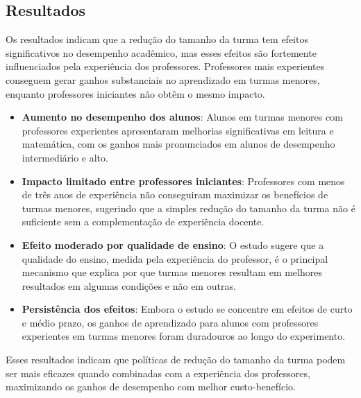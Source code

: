 \documentclass[a4paper,12pt]{article}[abntex2]
\begin{document}
\subsection{\textbf{Resultados}}

Os resultados indicam que a redução do tamanho da turma tem efeitos significativos no desempenho acadêmico, mas esses efeitos são fortemente influenciados pela experiência dos professores. Professores mais experientes conseguem gerar ganhos substanciais no aprendizado em turmas menores, enquanto professores iniciantes não obtêm o mesmo impacto.

\begin{itemize}
    \item \textbf{Aumento no desempenho dos alunos}: Alunos em turmas menores com professores experientes apresentaram melhorias significativas em leitura e matemática, com os ganhos mais pronunciados em alunos de desempenho intermediário e alto.
    \item \textbf{Impacto limitado entre professores iniciantes}: Professores com menos de três anos de experiência não conseguiram maximizar os benefícios de turmas menores, sugerindo que a simples redução do tamanho da turma não é suficiente sem a complementação de experiência docente.
    \item \textbf{Efeito moderado por qualidade de ensino}: O estudo sugere que a qualidade do ensino, medida pela experiência do professor, é o principal mecanismo que explica por que turmas menores resultam em melhores resultados em algumas condições e não em outras.
    \item \textbf{Persistência dos efeitos}: Embora o estudo se concentre em efeitos de curto e médio prazo, os ganhos de aprendizado para alunos com professores experientes em turmas menores foram duradouros ao longo do experimento.
\end{itemize}

Esses resultados indicam que políticas de redução do tamanho da turma podem ser mais eficazes quando combinadas com a experiência dos professores, maximizando os ganhos de desempenho com melhor custo-benefício.
\end{document}
